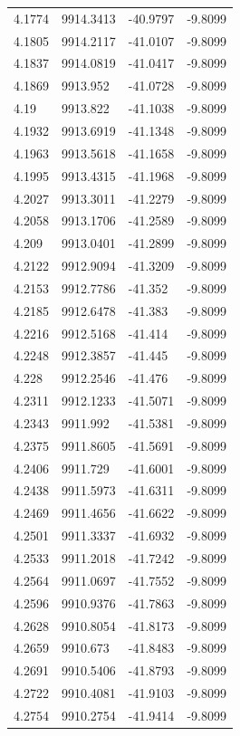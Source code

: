 \begin{table}[H]
\begin{tabular}{llll}
4.1774 & 9914.3413 & -40.9797 & -9.8099 \\
4.1805 & 9914.2117 & -41.0107 & -9.8099 \\
4.1837 & 9914.0819 & -41.0417 & -9.8099 \\
4.1869 & 9913.952 & -41.0728 & -9.8099 \\
4.19 & 9913.822 & -41.1038 & -9.8099 \\
4.1932 & 9913.6919 & -41.1348 & -9.8099 \\
4.1963 & 9913.5618 & -41.1658 & -9.8099 \\
4.1995 & 9913.4315 & -41.1968 & -9.8099 \\
4.2027 & 9913.3011 & -41.2279 & -9.8099 \\
4.2058 & 9913.1706 & -41.2589 & -9.8099 \\
4.209 & 9913.0401 & -41.2899 & -9.8099 \\
4.2122 & 9912.9094 & -41.3209 & -9.8099 \\
4.2153 & 9912.7786 & -41.352 & -9.8099 \\
4.2185 & 9912.6478 & -41.383 & -9.8099 \\
4.2216 & 9912.5168 & -41.414 & -9.8099 \\
4.2248 & 9912.3857 & -41.445 & -9.8099 \\
4.228 & 9912.2546 & -41.476 & -9.8099 \\
4.2311 & 9912.1233 & -41.5071 & -9.8099 \\
4.2343 & 9911.992 & -41.5381 & -9.8099 \\
4.2375 & 9911.8605 & -41.5691 & -9.8099 \\
4.2406 & 9911.729 & -41.6001 & -9.8099 \\
4.2438 & 9911.5973 & -41.6311 & -9.8099 \\
4.2469 & 9911.4656 & -41.6622 & -9.8099 \\
4.2501 & 9911.3337 & -41.6932 & -9.8099 \\
4.2533 & 9911.2018 & -41.7242 & -9.8099 \\
4.2564 & 9911.0697 & -41.7552 & -9.8099 \\
4.2596 & 9910.9376 & -41.7863 & -9.8099 \\
4.2628 & 9910.8054 & -41.8173 & -9.8099 \\
4.2659 & 9910.673 & -41.8483 & -9.8099 \\
4.2691 & 9910.5406 & -41.8793 & -9.8099 \\
4.2722 & 9910.4081 & -41.9103 & -9.8099 \\
4.2754 & 9910.2754 & -41.9414 & -9.8099 \\

\end{tabular}
\end{table}

